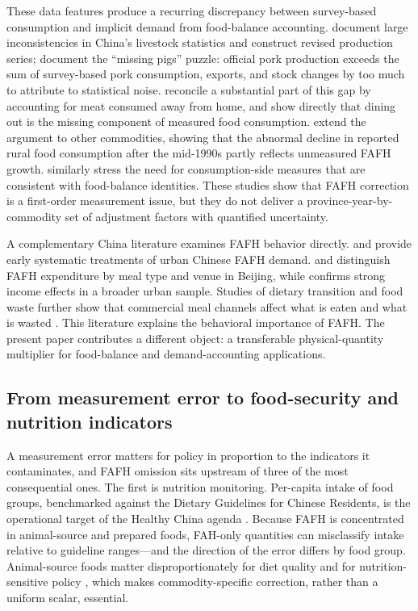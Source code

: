 \documentclass[preprint,12pt,authoryear]{elsarticle}
\begin{document}
These data features produce a recurring discrepancy between survey-based consumption and implicit demand from food-balance accounting. \citet{MaHuangRozelle2004} document large inconsistencies in China's livestock statistics and construct revised production series; \citet{YuAbler2014} document the ``missing pigs'' puzzle: official pork production exceeds the sum of survey-based pork consumption, exports, and stock changes by too much to attribute to statistical noise. \citet{Xiao2015} reconcile a substantial part of this gap by accounting for meat consumed away from home, and \citet{Bai2016DiningOut} show directly that dining out is the missing component of measured food consumption. \citet{YuAbler2016} extend the argument to other commodities, showing that the abnormal decline in reported rural food consumption after the mid-1990s partly reflects unmeasured FAFH growth. \citet{ZhouEtAl2020} similarly stress the need for consumption-side measures that are consistent with food-balance identities. These studies show that FAFH correction is a first-order measurement issue, but they do not deliver a province-year-by-commodity set of adjustment factors with quantified uncertainty.

A complementary China literature examines FAFH behavior directly. \citet{Gould2006} and \citet{Ma2006} provide early systematic treatments of urban Chinese FAFH demand. \citet{Bai2010} and \citet{Bai2012} distinguish FAFH expenditure by meal type and venue in Beijing, while \citet{Liu2015} confirms strong income effects in a broader urban sample. Studies of dietary transition and food waste further show that commercial meal channels affect what is eaten and what is wasted \citep{RenEtAl2019, GaoZheng2020, Zheng2019, Min2021, Xu2020FAFHwaste, Wang2025}. This literature explains the behavioral importance of FAFH. The present paper contributes a different object: a transferable physical-quantity multiplier for food-balance and demand-accounting applications.

\subsection{From measurement error to food-security and nutrition indicators}
\label{subsec:whyitmatters}

A measurement error matters for policy in proportion to the indicators it contaminates, and FAFH omission sits upstream of three of the most consequential ones. The first is nutrition monitoring. Per-capita intake of food groups, benchmarked against the Dietary Guidelines for Chinese Residents, is the operational target of the Healthy China agenda \citep{CNS2022}. Because FAFH is concentrated in animal-source and prepared foods, FAH-only quantities can misclassify intake relative to guideline ranges---and the direction of the error differs by food group. Animal-source foods matter disproportionately for diet quality and for nutrition-sensitive policy \citep{Zezza2017, FiedlerYadav2017, HeadeyEtAl2018}, which makes commodity-specific correction, rather than a uniform scalar, essential.
\end{document}
